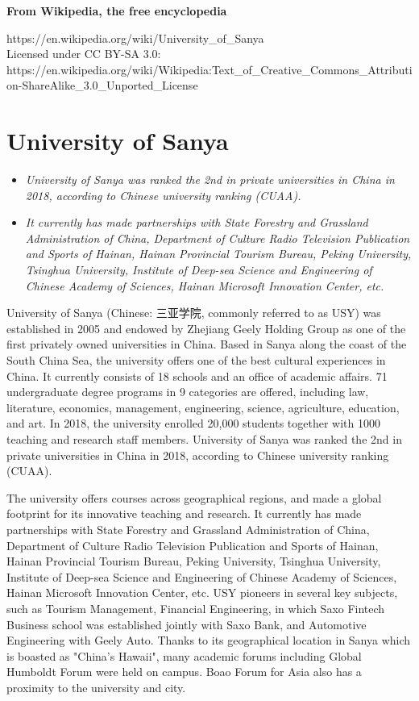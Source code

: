 \textbf{From Wikipedia, the free encyclopedia}

https://en.wikipedia.org/wiki/University\_of\_Sanya\\
Licensed under CC BY-SA 3.0:\\
https://en.wikipedia.org/wiki/Wikipedia:Text\_of\_Creative\_Commons\_Attribution-ShareAlike\_3.0\_Unported\_License

\section{University of Sanya}\label{university-of-sanya}

\begin{itemize}
\item
  \emph{University of Sanya was ranked the 2nd in private universities
  in China in 2018, according to Chinese university ranking (CUAA).}
\item
  \emph{It currently has made partnerships with State Forestry and
  Grassland Administration of China, Department of Culture Radio
  Television Publication and Sports of Hainan, Hainan Provincial Tourism
  Bureau, Peking University, Tsinghua University, Institute of Deep-sea
  Science and Engineering of Chinese Academy of Sciences, Hainan
  Microsoft Innovation Center, etc.}
\end{itemize}

University of Sanya (Chinese: 三亚学院, commonly referred to as USY) was
established in 2005 and endowed by Zhejiang Geely Holding Group as one
of the first privately owned universities in China. Based in Sanya along
the coast of the South China Sea, the university offers one of the best
cultural experiences in China. It currently consists of 18 schools and
an office of academic affairs. 71 undergraduate degree programs in 9
categories are offered, including law, literature, economics,
management, engineering, science, agriculture, education, and art. In
2018, the university enrolled 20,000 students together with 1000
teaching and research staff members. University of Sanya was ranked the
2nd in private universities in China in 2018, according to Chinese
university ranking (CUAA).

The university offers courses across geographical regions, and made a
global footprint for its innovative teaching and research. It currently
has made partnerships with State Forestry and Grassland Administration
of China, Department of Culture Radio Television Publication and Sports
of Hainan, Hainan Provincial Tourism Bureau, Peking University, Tsinghua
University, Institute of Deep-sea Science and Engineering of Chinese
Academy of Sciences, Hainan Microsoft Innovation Center, etc. USY
pioneers in several key subjects, such as Tourism Management, Financial
Engineering, in which Saxo Fintech Business school was established
jointly with Saxo Bank, and Automotive Engineering with Geely Auto.
Thanks to its geographical location in Sanya which is boasted as
"China's Hawaii", many academic forums including Global Humboldt Forum
were held on campus. Boao Forum for Asia also has a proximity to the
university and city.

